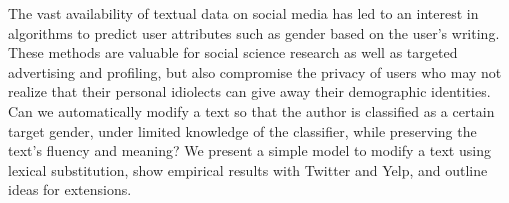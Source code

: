 The vast availability of textual data on social media has led to an interest in algorithms to predict user attributes such as gender based on the user's writing. These methods              are valuable for social science research as well as targeted advertising and profiling, but also compromise the privacy of users who may not realize that their personal idiolects can give away their demographic identities. Can we automatically modify a text so that the author is classified as a certain target gender, under limited knowledge of the classifier, while preserving the text's fluency and meaning? We present a simple model to modify a text using lexical substitution, show empirical results with Twitter and Yelp, and outline ideas for extensions.
